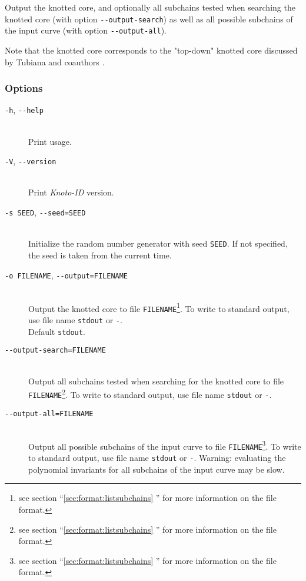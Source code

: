 Output the knotted core,  and optionally all subchains tested when searching the knotted core (with option \lstinline{--output-search}) as well as all possible subchains of the input curve (with option \lstinline{--output-all}).

Note that the knotted core corresponds to the "top-down" knotted core discussed by Tubiana and coauthors \cite{tubiana2011}.

\subsubsection{Options}
\begin{description}
\item[\lstinline{-h}, \lstinline{--help}]\hfill\\
  Print usage.
\item[\lstinline{-V}, \lstinline{--version}]\hfill\\
  Print {\it Knoto-ID} version.
\item[\lstinline{-s SEED}, \lstinline{--seed=SEED}]\hfill\\
  Initialize the random number generator with  seed \lstinline{SEED}. If not specified, the seed is taken from the current time. 
\item[\lstinline{-o FILENAME}, \lstinline{--output=FILENAME}]\hfill\\
  Output the knotted core to file \lstinline{FILENAME}\footnote{see section ``\ref{sec:format:listsubchains} '' for more information on the file format.}.  To write to standard output, use file name \lstinline{stdout} or \lstinline{-}.\\
  Default \lstinline{stdout}.
\item[\lstinline{--output-search=FILENAME}]\hfill\\
  Output all subchains tested when searching for the knotted core to file \lstinline{FILENAME}\footnote{see section ``\ref{sec:format:listsubchains} '' for more information on the file format.}. To write to standard output, use file name \lstinline{stdout} or \lstinline{-}.
\item[\lstinline{--output-all=FILENAME}]\hfill\\
  Output all possible subchains of the input curve to file \lstinline{FILENAME}\footnote{see section ``\ref{sec:format:listsubchains} '' for more information on the file format.}. To write to standard output, use file name \lstinline{stdout} or \lstinline{-}. Warning: evaluating the polynomial invariants for all subchains of the input curve may be slow.

\end{description}
